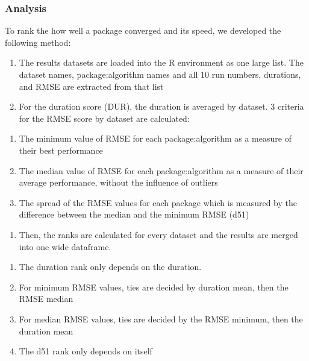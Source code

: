 \hypertarget{analysis}{%
\subsubsection{Analysis}\label{analysis}}

To rank the how well a package converged and its speed, we developed the
following method:

\begin{enumerate}
\def\labelenumi{\arabic{enumi}.}
\tightlist
\item
  The results datasets are loaded into the R environment as one large
  list. The dataset names, package:algorithm names and all 10 run
  numbers, durations, and RMSE are extracted from that list
\item
  For the duration score (DUR), the duration is averaged by dataset. 3
  criteria for the RMSE score by dataset are calculated:
\end{enumerate}

\begin{enumerate}
\def\labelenumi{\alph{enumi}.}
\tightlist
\item
  The minimum value of RMSE for each package:algorithm as a measure of
  their best performance
\item
  The median value of RMSE for each package:algorithm as a measure of
  their average performance, without the influence of outliers
\item
  The spread of the RMSE values for each package which is measured by
  the difference between the median and the minimum RMSE (d51)
\end{enumerate}

\begin{enumerate}
\def\labelenumi{\arabic{enumi}.}
\setcounter{enumi}{2}
\tightlist
\item
  Then, the ranks are calculated for every dataset and the results are
  merged into one wide dataframe.
\end{enumerate}

\begin{enumerate}
\def\labelenumi{\alph{enumi}.}
\tightlist
\item
  The duration rank only depends on the duration.
\item
  For minimum RMSE values, ties are decided by duration mean, then the
  RMSE median
\item
  For median RMSE values, ties are decided by the RMSE minimum, then the
  duration mean
\item
  The d51 rank only depends on itself
\end{enumerate}

